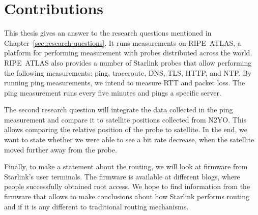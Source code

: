 \section{Contributions} \label{sec:contributions}

This thesis gives an answer to the research questions mentioned in Chapter~\ref{sec:research-questions}.
It runs measurements on RIPE~ATLAS, a platform for performing measurement with probes distributed across the world.
RIPE~ATLAS also provides a number of Starlink probes that allow performing the following measurements: ping, traceroute, DNS, TLS, HTTP, and NTP.
By running ping measurements, we intend to measure \ac{RTT} and packet loss. The ping measurement runs every five minutes and pings a specific server.

The second research question will integrate the data collected in the ping measurement and compare it to satellite positions collected from N2YO. This allows comparing the relative position of the probe to satellite.
In the end, we want to state whether we were able to see a bit rate decrease, when the satellite moved further away from the probe.

Finally, to make a statement about the routing, we will look at firmware from Starlink's user terminals. The firmware is available at different blogs, where people successfully obtained root access.
We hope to find information from the firmware that allows to make conclusions about how Starlink performs routing and if it is any different to traditional routing mechanisms.
